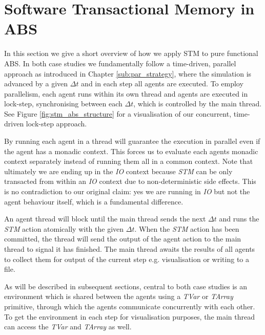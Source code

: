 \section{Software Transactional Memory in ABS}
\label{sec:stm_abs}
In this section we give a short overview of how we apply STM to pure functional ABS. In both case studies we fundamentally follow a time-driven, parallel approach as introduced in Chapter \ref{sub:par_strategy}, where the simulation is advanced by a given $\Delta t$ and in each step all agents are executed. To employ parallelism, each agent runs within its own thread and agents are executed in lock-step, synchronising between each $\Delta t$, which is controlled by the main thread. See Figure \ref{fig:stm_abs_structure} for a visualisation of our concurrent, time-driven lock-step approach.

By running each agent in a thread will guarantee the execution in parallel even if the agent has a monadic context. This forces us to evaluate each agents monadic context separately instead of running them all in a common context. Note that ultimately we are ending up in the \textit{IO} context because \textit{STM} can be only transacted from within an \textit{IO} context due to non-deterministic side effects. This is no contradiction to our original claim: yes we are running in \textit{IO} but not the agent behaviour itself, which is a fundamental difference.

An agent thread will block until the main thread sends the next $\Delta t$ and runs the \textit{STM} action atomically with the given $\Delta t$. When the \textit{STM} action has been committed, the thread will send the output of the agent action to the main thread to signal it has finished. The main thread awaits the results of all agents to collect them for output of the current step e.g. visualisation or writing to a file.

As will be described in subsequent sections, central to both case studies is an environment which is shared between the agents using a \textit{TVar} or \textit{TArray} primitive, through which the agents communicate concurrently with each other. To get the environment in each step for visualisation purposes, the main thread can access the \textit{TVar} and \textit{TArray} as well. 

